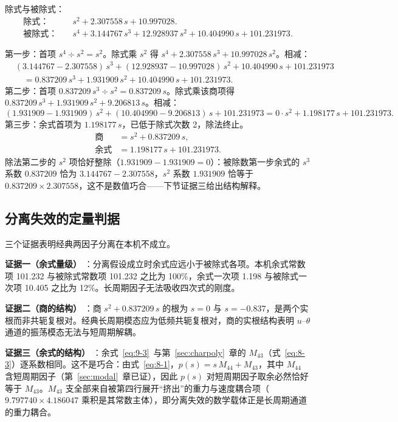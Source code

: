 \documentclass[11pt,a4paper]{ctexart}
\begin{document}
除式与被除式：
\begin{align*}
\text{除式：}\quad & s^2+2.307558\,s+10.997028.\\
\text{被除式：}\quad & s^4+3.144767\,s^3+12.928937\,s^2+10.404990\,s+101.231973.
\end{align*}

第一步：首项 $s^4\div s^2=s^2$。除式乘 $s^2$ 得 $s^4+2.307558\,s^3+10.997028\,s^2$。相减：
\begin{align*}
& (3.144767-2.307558)\,s^3 + (12.928937-10.997028)\,s^2 + 10.404990\,s + 101.231973\\
&\quad = 0.837209\,s^3 + 1.931909\,s^2 + 10.404990\,s + 101.231973.
\end{align*}
第二步：首项 $0.837209\,s^3\div s^2=0.837209\,s$。除式乘该商项得 $0.837209\,s^3+1.931909\,s^2+9.206813\,s$。相减：
\[
(1.931909-1.931909)\,s^2 + (10.404990-9.206813)\,s + 101.231973
= 0\cdot s^2 + 1.198177\,s + 101.231973.
\]
第三步：余式首项为 $1.198177\,s$，已低于除式次数 2，除法终止。
\begin{align}
\text{商} &= s^2 + 0.837209\,s, \label{eq:9-2}\tag{(9-2)}\\[2pt]
\text{余式} &= 1.198177\,s + 101.231973. \label{eq:9-3}\tag{(9-3)}
\end{align}
除法第二步的 $s^2$ 项恰好整除（$1.931909-1.931909=0$）：被除数第一步余式的 $s^3$ 系数 $0.837209$ 恰为 $3.144767-2.307558$，$s^2$ 系数 $1.931909$ 恰等于 $0.837209\times 2.307558$，这不是数值巧合——下节证据三给出结构解释。

\subsection{分离失效的定量判据}

三个证据表明经典两因子分离在本机不成立。

\textbf{证据一（余式量级） }：分离假设成立时余式应远小于被除式各项。本机余式常数项 101.232 与被除式常数项 101.232 之比为 100\%，余式一次项 1.198 与被除式一次项 10.405 之比为 12\%。长周期因子无法吸收四次式的刚度。

\textbf{证据二（商的结构） }：商 $s^2+0.837209\,s$ 的根为 $s=0$ 与 $s=-0.837$，是两个实根而非共轭复根对。经典长周期模态应为低频共轭复根对，商的实根结构表明 $u$--$\theta$ 通道的振荡模态无法与短周期解耦。

\textbf{证据三（余式的结构） }：余式~\eqref{eq:9-3}~与第~\ref{sec:charpoly}~章的 $M_{43}$（式~\eqref{eq:8-3}）逐系数相同。这不是巧合：由式~\eqref{eq:8-1}，$p(s)=s\,M_{44}+M_{43}$，其中 $M_{44}$ 含短周期因子（第~\ref{sec:modal}~章已证），因此 $p(s)$ 对短周期因子取余必然恰好等于 $M_{43}$。$M_{43}$ 支全部来自被第四行展开“挤出”的重力与速度耦合项（$9.797740\times 4.186047$ 乘积是其常数主体），即分离失效的数学载体正是长周期通道的重力耦合。
\end{document}
